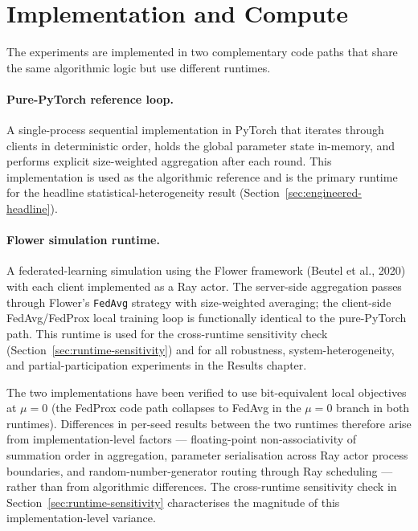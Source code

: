 \documentclass[11pt,a4paper]{report}
\begin{document}
\section{Implementation and Compute}
\label{sec:methods-implementation}

The experiments are implemented in two complementary code paths
that share the same algorithmic logic but use different runtimes.

\paragraph{Pure-PyTorch reference loop.}
A single-process sequential implementation in PyTorch that
iterates through clients in deterministic order, holds the
global parameter state in-memory, and performs explicit
size-weighted aggregation after each round. This implementation
is used as the algorithmic reference and is the primary runtime
for the headline statistical-heterogeneity result
(Section~\ref{sec:engineered-headline}).

\paragraph{Flower simulation runtime.}
A federated-learning simulation using the Flower framework
(Beutel et al., 2020) with each client implemented as a Ray
actor. The server-side aggregation passes through Flower's
\texttt{FedAvg} strategy with size-weighted averaging; the
client-side FedAvg/FedProx local training loop is functionally
identical to the pure-PyTorch path. This runtime is used for
the cross-runtime sensitivity check
(Section~\ref{sec:runtime-sensitivity}) and for all
robustness, system-heterogeneity, and partial-participation
experiments in the Results chapter.

The two implementations have been verified to use bit-equivalent
local objectives at $\mu = 0$ (the FedProx code path collapses
to FedAvg in the $\mu = 0$ branch in both runtimes). Differences
in per-seed results between the two runtimes therefore arise
from implementation-level factors --- floating-point
non-associativity of summation order in aggregation, parameter
serialisation across Ray actor process boundaries, and
random-number-generator routing through Ray scheduling ---
rather than from algorithmic differences. The cross-runtime
sensitivity check in Section~\ref{sec:runtime-sensitivity}
characterises the magnitude of this implementation-level
variance.
\end{document}
